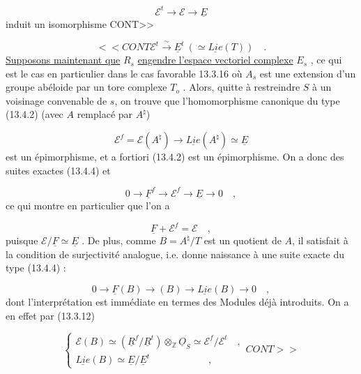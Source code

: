 \begin{equation*}
\mathcal{E}^t \longrightarrow \mathcal{E} \longrightarrow \underline{E}
\end{equation*}
induit un isomorphisme CONT>>



\begin{equation}\tag{13.4.11}
<<CONT \mathcal{E}^t \stackrel{\sim}{\longrightarrow} \underline{E}^t \ ( \simeq \underline{Lie}(T)) \quad .
\end{equation}
\underline{Supposons maintenant que} $R_s$ \underline{engendre l'espace vectoriel complexe} $E_s$ , ce qui est le cas en particulier dans le cas favorable 13.3.16 où $A_s$ est une extension d'un groupe abéloide par un tore complexe $T_o$ . Alors, quitte à restreindre $S$ à un voisinage convenable de $s$, on trouve que l'homomorphisme canonique du type (13.4.2) (avec $A$ remplacé par $A^\natural$)

\begin{equation*}
\mathcal{E}^f = \mathcal{E}(A^\natural) \longrightarrow \underline{Lie}(A^\natural) \simeq \underline{E}
\end{equation*}
est un épimorphisme, et a fortiori (13.4.2) est un épimorphisme. On a donc des suites exactes (13.4.4) et

\begin{equation}\tag{13.4.12}
0 \longrightarrow \underline{F}^f \longrightarrow \mathcal{E}^f \longrightarrow \underline{E} \longrightarrow 0 \quad ,
\end{equation}
ce qui montre en particulier que l'on a

\begin{equation}\tag{13.4.13}
\underline{F} + \mathcal{E}^f = \mathcal{E} \quad ,
\end{equation}
puisque $\mathcal{E}/\underline{F} \simeq \underline{E}$ . De plus, comme $B = A^\natural/T$ est un quotient de $A$, il satisfait à la condition de surjectivité analogue, i.e. donne naissance à une suite exacte du type (13.4.4) :

\begin{equation}\tag{13.4.14}
0 \longrightarrow \underline{F}(B) \longrightarrow (B) \longrightarrow \underline{Lie}(B) \longrightarrow 0 \quad ,
\end{equation}
dont l'interprétation est immédiate en termes des Modules déjà introduits. On a en effet par (13.3.12)

\begin{equation}\tag{13.4.15}
\left\{ \begin{array}{l} \mathcal{E}(B) \simeq (\underline{R}^f / \underline{R}^t) \otimes_{\mathbb{Z}} \underline{O}_S \simeq \mathcal{E}^f / \mathcal{E}^t \quad , \\[3ex] \underline{Lie}(B) \simeq \underline{E} / \underline{E}^t \qquad\qquad\qquad , \end{array} \right. CONT>>
\end{equation}

